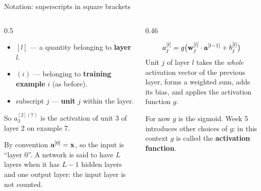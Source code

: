 \documentclass[aspectratio=169,10pt]{beamer}
\begin{document}
\begin{frame}{Notation: superscripts in square brackets}
  \begin{columns}[T,onlytextwidth]
    \begin{column}{0.5\textwidth}
      \begin{defnbox}
        \small
        \begin{itemize}
          \item $[l]$ --- a quantity belonging to \textbf{layer} $l$.
          \item $(i)$ --- belonging to \textbf{training example} $i$ (as before).
          \item subscript $j$ --- \textbf{unit} $j$ within the layer.
        \end{itemize}
        So $a^{[2](7)}_3$ is the activation of unit 3 of layer 2 on example 7.
      \end{defnbox}
      \footnotesize
      By convention $\mathbf{a}^{[0]}=\mathbf{x}$, so the input is ``layer 0''. A network is said to have
      $L$ layers when it has $L-1$ hidden layers and one output layer: the input layer is not
      counted.
    \end{column}
    \begin{column}{0.46\textwidth}
      \begin{keyidea}
        \[ a^{[l]}_j = g\bigl(\mathbf{w}^{[l]}_j\cdot\mathbf{a}^{[l-1]} + b^{[l]}_j\bigr) \]
        \footnotesize
        Unit $j$ of layer $l$ takes the \emph{whole} activation vector of the previous layer,
        forms a weighted sum, adds its bias, and applies the activation function $g$.
      \end{keyidea}
      \footnotesize
      For now $g$ is the sigmoid. Week 5 introduces other choices of $g$; in this
      context $g$ is called the \textbf{activation function}.
    \end{column}
  \end{columns}
\end{frame}
\end{document}
